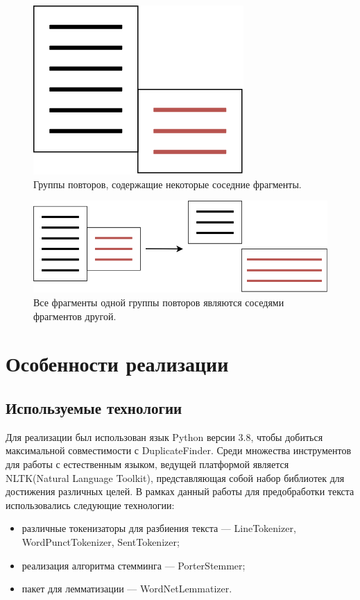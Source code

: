 \documentclass[14pt]{matmex-diploma-custom}
\begin{document}
\begin{figure}[h!]
	\includegraphics[scale=0.5]{pictures/Balance2.png}
	\centering
	\caption{Группы повторов, содержащие некоторые соседние фрагменты.}
	\label{fig:Balance2}
\end{figure}

\begin{figure}[h!]
	\includegraphics[scale=0.5]{pictures/Balance3.png}
	\centering
	\caption{Все фрагменты одной группы повторов являются соседями фрагментов другой.}
	\label{fig:Balance3}
\end{figure}

\clearpage
\section{Особенности реализации}

\subsection{Используемые технологии}

Для реализации был использован язык Python версии 3.8, чтобы добиться максимальной совместимости с DuplicateFinder. Среди множества инструментов для работы с естественным языком, ведущей платформой является NLTK(Natural Language Toolkit), представляющая собой набор библиотек для достижения различных целей. В рамках данный работы для предобработки текста использовались следующие технологии:
\begin{itemize}
	\item различные токенизаторы для разбиения текста --- LineTokenizer, WordPunctTokenizer, SentTokenizer;
	\item реализация алгоритма стемминга --- PorterStemmer;
	\item пакет для лемматизации --- WordNetLemmatizer.
\end{itemize}
\end{document}

